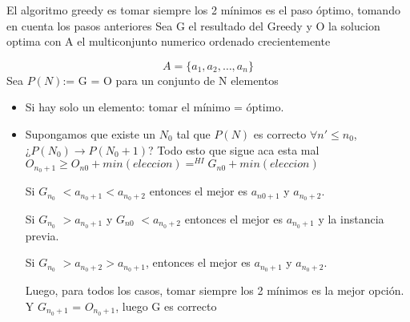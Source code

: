 \documentclass{article}
\begin{document}
El algoritmo greedy es tomar siempre los 2 mínimos es el paso óptimo, tomando en cuenta los pasos anteriores
Sea G el resultado del Greedy y O la solucion optima con A el multiconjunto numerico ordenado crecientemente

\[ A = \{a_1, a_2,\dots, a_n\} \] 
Sea \( P(N) \):= G = O para un conjunto de N elementos

\begin{itemize}
	
    
\item Si hay solo un elemento: tomar el  mínimo = óptimo.
    
    \item Supongamos que existe un \( N_0 \) tal que \( P(N) \) es correcto \(\forall n' \le n_0 \), 
    \\¿\( P(N_0) \rightarrow P(N_0 + 1) \)?  Todo esto que sigue aca esta mal\\
    
    \( O_{n_0+1} \ge O_{n0} + min(eleccion)  =^{HI} G_{n0} + min(eleccion)\)
    
    Si \(G_{n_0}\) \( < a_{n_0+1}  < a_{n_0+2} \) entonces el mejor es \( a_{n0+1} \) y \( a_{n_0+2} \).
    
    Si \(G_{n_0}\) \( > a_{n_0+1} \) y \(G_{n0}\) \( < a_{n_0+2} \) entonces el mejor es \( a_{n_0+1} \) y la instancia previa.
    
    Si \(G_{n_0}\) \( > a_{n_0+2}  >  a_{n_0+1} \), entonces el mejor es \( a_{n_0+1} \) y \( a_{n_0+2} \).
    
    Luego, para todos los casos, tomar siempre los 2 mínimos es la mejor opción.  Y \(G_{n_0 + 1} \) = \(O_{n_0+1}\), luego G es correcto 
    
\end{itemize}
\end{document}
